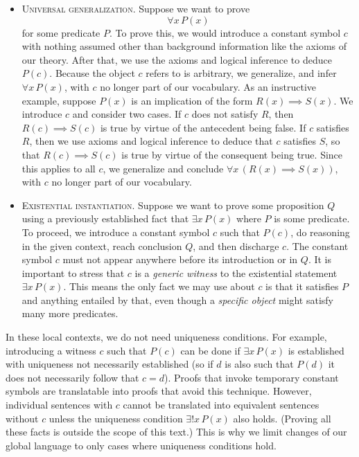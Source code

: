 \begin{itemize}[itemsep=-0.4ex]
	\item\textsc{Universal generalization.}
	Suppose we want to prove
	\[ \forall x\, P(x) \]
	for some predicate $P$.
	To prove this, we would introduce a constant symbol $c$ with nothing assumed other than background information like the axioms of our theory.
	After that, we use the axioms and logical inference to deduce $P(c)$.
	Because the object $c$ refers to is arbitrary, we generalize, and infer $\forall x\, P(x)$, with $c$ no longer part of our vocabulary. 
	As an instructive example, suppose $P(x)$ is an implication of the form $R(x)\implies S(x)$. 
	We introduce $c$ and consider two cases.
	If $c$ does not satisfy $R$, then $R(c)\implies S(c)$ is true by virtue of the antecedent being false. 
	If $c$ satisfies $R$, then we use axioms and logical inference to deduce that $c$ satisfies $S$, so that $R(c)\implies S(c)$ is true by virtue of the consequent being true. 
	Since this applies to all $c$, we generalize and conclude $\forall x\, (R(x)\implies S(x))$, with $c$ no longer part of our vocabulary. 
	\item\textsc{Existential instantiation.}
	Suppose we want to prove some proposition $Q$ using a previously established fact that $\exists x\, P(x)$ where $P$ is some predicate. 
	To proceed, we introduce a constant symbol $c$ such that $P(c)$, do reasoning in the given context, reach conclusion $Q$, and then discharge $c$.
	The constant symbol $c$ must not appear anywhere before its introduction or in $Q$.
	It is important to stress that $c$ is a \emph{generic witness} to the existential statement $\exists x\, P(x)$. 
	This means the only fact we may use about $c$ is that it satisfies $P$ and anything entailed by that, even though a \emph{specific object} might satisfy many more predicates. 
\end{itemize}

\noindent In these local contexts, we do not need uniqueness conditions.
For example, introducing a witness $c$ such that $P(c)$ can be done if $\exists x\, P(x)$ is established with uniqueness not necessarily established (so if $d$ is also such that $P(d)$ it does not necessarily follow that $c = d$). 
Proofs that invoke temporary constant symbols are translatable into proofs that avoid this technique.
However, individual sentences with $c$ cannot be translated into equivalent sentences without $c$ unless the uniqueness condition $\exists ! x\, P(x)$ also holds.
(Proving all these facts is outside the scope of this text.)
This is why we limit changes of our global language to only cases where uniqueness conditions hold. 

